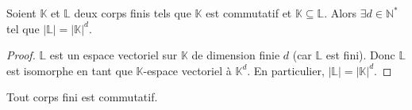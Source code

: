 





  \begin{lemma}
    \label{theoreme-de-wedderburn-1}
    Soient $\mathbb{K}$ et $\mathbb{L}$ deux corps finis tels que $\mathbb{K}$ est commutatif et $\mathbb{K} \subseteq \mathbb{L}$. Alors $\exists d \in \mathbb{N}^*$ tel que $|\mathbb{L}| = |\mathbb{K}|^d$.
  \end{lemma}

  \begin{proof}
    $\mathbb{L}$ est un espace vectoriel sur $\mathbb{K}$ de dimension finie $d$ (car $\mathbb{L}$ est fini). Donc $\mathbb{L}$ est isomorphe en tant que $\mathbb{K}$-espace vectoriel à $\mathbb{K}^d$. En particulier, $|\mathbb{L}| = |\mathbb{K}|^d$.
  \end{proof}

  \begin{theorem}[Wedderburn]
    Tout corps fini est commutatif.
  \end{theorem}


